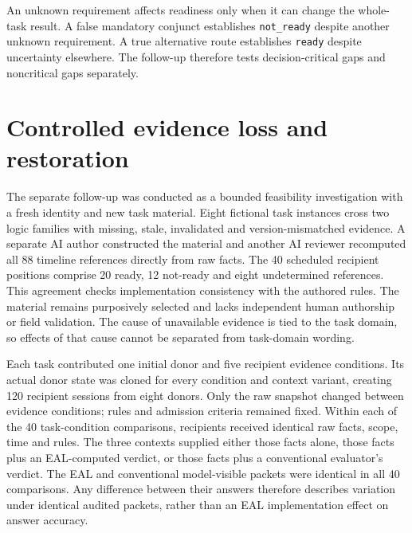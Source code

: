 \documentclass[
  11pt,
]{article}
\begin{document}
An unknown requirement affects readiness only when it can change the
whole-task result. A false mandatory conjunct establishes
\texttt{not\_ready} despite another unknown requirement. A true
alternative route establishes \texttt{ready} despite uncertainty
elsewhere. The follow-up therefore tests decision-critical gaps and
noncritical gaps separately.

\FloatBarrier

\hypertarget{controlled-evidence-loss-and-restoration}{%
\section{Controlled evidence loss and
restoration}\label{controlled-evidence-loss-and-restoration}}

The separate follow-up was conducted as a bounded feasibility
investigation with a fresh identity and new task material. Eight
fictional task instances cross two logic families with missing, stale,
invalidated and version-mismatched evidence. A separate AI author
constructed the material and another AI reviewer recomputed all 88
timeline references directly from raw facts. The 40 scheduled recipient
positions comprise 20 ready, 12 not-ready and eight undetermined
references. This agreement checks implementation consistency with the
authored rules. The material remains purposively selected and lacks
independent human authorship or field validation. The cause of
unavailable evidence is tied to the task domain, so effects of that
cause cannot be separated from task-domain wording.

Each task contributed one initial donor and five recipient evidence
conditions. Its actual donor state was cloned for every condition and
context variant, creating 120 recipient sessions from eight donors. Only
the raw snapshot changed between evidence conditions; rules and
admission criteria remained fixed. Within each of the 40 task-condition
comparisons, recipients received identical raw facts, scope, time and
rules. The three contexts supplied either those facts alone, those facts
plus an EAL-computed verdict, or those facts plus a conventional
evaluator's verdict. The EAL and conventional model-visible packets were
identical in all 40 comparisons. Any difference between their answers
therefore describes variation under identical audited packets, rather
than an EAL implementation effect on answer accuracy.
\end{document}
